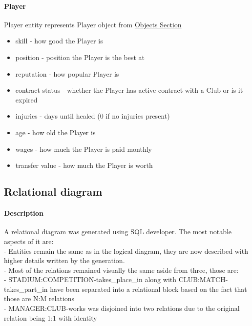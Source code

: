 \documentclass{report}
\begin{document}
\paragraph{Player}
Player entity represents Player object from \hyperref[Objects Section]{Objects Section}
\begin{itemize}
    \item skill - how good the Player is
    \item position - position the Player is the best at
    \item reputation - how popular Player is
    \item contract status - whether the Player has active contract with a Club or is it expired
    \item injuries - days until healed (0 if no injuries present)
    \item age - how old the Player is
    \item wages - how much the Player is paid monthly
    \item transfer value - how much the Player is worth
\end{itemize}

\subsection{Relational diagram}
\paragraph{Description}
A relational diagram was generated using SQL developer. The most notable aspects of it are:\\
- Entities remain the same as in the logical diagram, they are now described with higher details written by the generation.\\
- Most of the relations remained visually the same aside from three, those are:\\
- STADIUM:COMPETITION-takes\_place\_in along with CLUB:MATCH-takes\_part\_in have been separated into a relational block based on the fact that those are N:M relations\\
- MANAGER:CLUB-works was disjoined into two relations due to the original relation being 1:1 with identity
\end{document}
